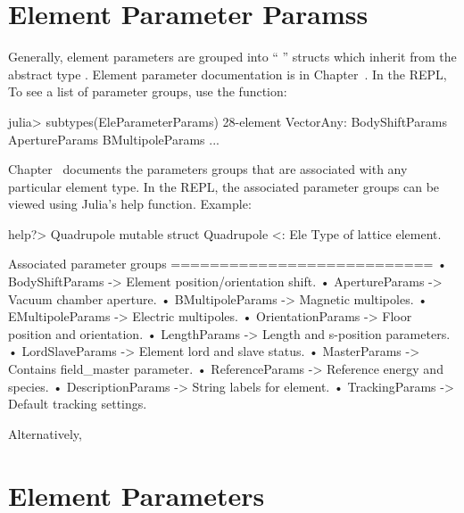 \section{Element Parameter Paramss}
\label{s:ele.groups}

Generally, element parameters are grouped into ``  '' 
structs which inherit from the abstract type . 
Element parameter documentation is in Chapter~. In the REPL,
To see a list of parameter groups, use the  function:
\begin{example}
  julia> subtypes(EleParameterParams)
  28-element Vector{Any}:
   BodyShiftParams
   ApertureParams
   BMultipoleParams
   ...
\end{example}
Chapter~ documents the parameters groups that are associated with any particular element type.
In the REPL, the associated parameter groups can be viewed using Julia's help function. Example: 
\begin{example}
  help?> Quadrupole
    mutable struct Quadrupole <: Ele
    Type of lattice element.

    Associated parameter groups
    ===========================
      •  BodyShiftParams -> Element position/orientation shift.
      •  ApertureParams -> Vacuum chamber aperture.
      •  BMultipoleParams -> Magnetic multipoles.
      •  EMultipoleParams -> Electric multipoles.
      •  OrientationParams -> Floor position and orientation.
      •  LengthParams -> Length and s-position parameters.
      •  LordSlaveParams -> Element lord and slave status.
      •  MasterParams -> Contains field_master parameter.
      •  ReferenceParams -> Reference energy and species.
      •  DescriptionParams -> String labels for element.
      •  TrackingParams -> Default tracking settings.
\end{example}
Alternatively, 

\section{Element Parameters}
\label{s:ele.params}

